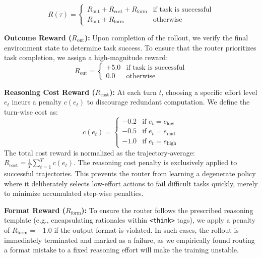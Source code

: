 \documentclass{article}
\theoremstyle{plain}
\theoremstyle{definition}
\theoremstyle{remark}
\begin{document}
\begin{equation}
    R(\tau) = 
    \begin{cases}
    R_{\text{out}} + R_{\text{cost}} + R_{\text{form}} & \text{if task is successful} \\
    R_{\text{out}} + R_{\text{form}} & \text{otherwise}
    \end{cases}   
\end{equation}



 \textbf{Outcome Reward ($R_{\text{out}}$):} Upon completion of the rollout, we verify the final environment state to determine task success. To ensure that the router prioritizes task completion, we assign a high-magnitude reward:
\begin{equation}
    R_{\text{out}} = 
    \begin{cases} 
    +5.0 & \text{if task is successful} \\
    0.0 & \text{otherwise}
    \end{cases}
\end{equation}

 \textbf{Reasoning Cost Reward ($R_{\text{cost}}$):} At each turn $t$, choosing a specific effort level $e_t$ incurs a penalty $c(e_t)$ to discourage redundant computation. We define the turn-wise cost as:
\begin{equation}
    c(e_t) = 
    \begin{cases} 
    -0.2 & \text{if } e_t = e_{\text{low}} \\
    -0.5 & \text{if } e_t = e_{\text{mid}} \\
    -1.0 & \text{if } e_t = e_{\text{high}}
    \end{cases}
\end{equation}
The total cost reward is normalized as the trajectory-average: $R_{\text{cost}} = \frac{1}{T} \sum_{t=1}^{T} c(e_t)$. The reasoning cost penalty is exclusively applied to successful trajectories. This prevents the router from learning a degenerate policy where it deliberately selects low-effort actions to fail difficult tasks quickly, merely to minimize accumulated step-wise penalties.



 \textbf{Format Reward ($R_{\text{form}}$):} To ensure the router follows the prescribed reasoning template (e.g., encapsulating rationales within \texttt{<think>} tags), we apply a penalty of $R_{\text{form}} = -1.0$ if the output format is violated. In such cases, the rollout is immediately terminated and marked as a failure, as we empirically found routing a format mistake to a fixed reasoning effort will make the training unstable.
\end{document}
